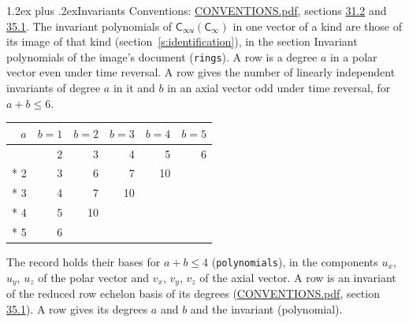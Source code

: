 \documentclass[10pt,a4paper]{article}
\makeatletter
\renewcommand\section{\@startsection{section}{1}{\z@}{-3ex plus -1ex minus -.2ex}%
  {1.2ex plus .2ex}{\normalfont\large\sffamily\bfseries\color{parttitle}}}
\numberwithin{equation}{section}
\newcommand{\grp}[1]{\mathsf{#1}}
\makeatother
\begin{document}
\section{Invariants}\label{s:invariants}
Conventions: \href{../../CONVENTIONS.pdf}{CONVENTIONS.pdf}, sections \href{../../CONVENTIONS.pdf\#conv.31.2}{31.2} and \href{../../CONVENTIONS.pdf\#conv.35.1}{35.1}.
The invariant polynomials of $\grp{C_{\infty v}}(\grp{C_{\infty}})$ in one vector of a kind are those of its image of that kind (section~\ref{s:identification}), in the section Invariant polynomials of the image's document (\texttt{rings}).
\leavevmode\label{n:index.degree.polar}\label{n:index.degree.axial}A row is a degree $a$ in a polar vector even under time reversal. A row gives the number of linearly independent invariants of degree $a$ in it and $b$ in an axial vector odd under time reversal, for $a + b \le 6$.
{\small\begin{longtable}{@{}rrrrrr@{}}\toprule
$a$ & $b = 1$ & $b = 2$ & $b = 3$ & $b = 4$ & $b = 5$\\\midrule\endhead
\bottomrule\endfoot\endlastfoot
1 & 2 & 3 & 4 & 5 & 6\\*
2 & 3 & 6 & 7 & 10 & \\*
3 & 4 & 7 & 10 &  & \\*
4 & 5 & 10 &  &  & \\*
5 & 6 &  &  &  & \\
\bottomrule\end{longtable}}
\leavevmode\label{n:local.component.polar}\label{n:local.component.axial}The record holds their bases for $a + b \le 4$ (\texttt{polynomials}), in the components $u_{x}$, $u_{y}$, $u_{z}$ of the polar vector and $v_{x}$, $v_{y}$, $v_{z}$ of the axial vector. \label{n:head.polynomial}A row is an invariant of the reduced row echelon basis of its degrees (\href{../../CONVENTIONS.pdf}{CONVENTIONS.pdf}, section \href{../../CONVENTIONS.pdf\#conv.35.1}{35.1}). A row gives its degrees $a$ and $b$ and the invariant (polynomial).
\end{document}

